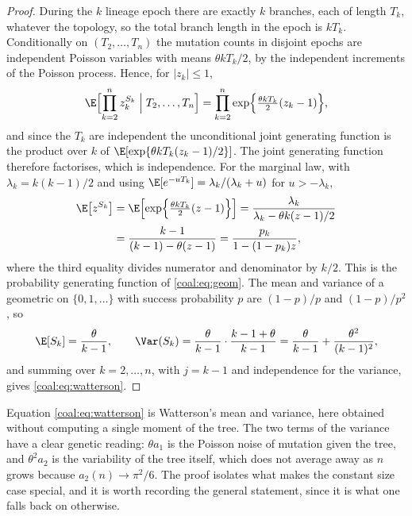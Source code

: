 \begin{proof}
During the $k$ lineage epoch there are exactly $k$ branches, each of length $T_k$, whatever the topology, so the total branch length in the epoch is $kT_k$. Conditionally on $(T_2,\dots,T_n)$ the mutation counts in disjoint epochs are independent Poisson variables with means $\theta kT_k/2$, by the independent increments of the Poisson process. Hence, for $|z_k|\le1$,
\[
\E\Bigl[\prod_{k=2}^n z_k^{S_k}\Bigm| T_2,\dots,T_n\Bigr]=\prod_{k=2}^n\exp\Bigl\{\tfrac{\theta kT_k}{2}(z_k-1)\Bigr\},
\]
and since the $T_k$ are independent the unconditional joint generating function is the product over $k$ of $\E[\exp\{\theta kT_k(z_k-1)/2\}]$. The joint generating function therefore factorises, which is independence. For the marginal law, with $\lambda_k=k(k-1)/2$ and using $\E[e^{-uT_k}]=\lambda_k/(\lambda_k+u)$ for $u>-\lambda_k$,
\begin{align*}
\E\bigl[z^{S_k}\bigr] &= \E\Bigl[\exp\Bigl\{\tfrac{\theta kT_k}{2}(z-1)\Bigr\}\Bigr]
= \frac{\lambda_k}{\lambda_k-\theta k(z-1)/2}\\
&= \frac{k-1}{(k-1)-\theta(z-1)} = \frac{p_k}{1-(1-p_k)z},
\end{align*}
where the third equality divides numerator and denominator by $k/2$. This is the probability generating function of \eqref{coal:eq:geom}. The mean and variance of a geometric on $\{0,1,\dots\}$ with success probability $p$ are $(1-p)/p$ and $(1-p)/p^2$, so
\[
\E[S_k]=\frac{\theta}{k-1},\qquad \Var(S_k)=\frac{\theta}{k-1}\cdot\frac{k-1+\theta}{k-1}=\frac{\theta}{k-1}+\frac{\theta^2}{(k-1)^2},
\]
and summing over $k=2,\dots,n$, with $j=k-1$ and independence for the variance, gives \eqref{coal:eq:watterson}.
\end{proof}

\begin{sloppypar}Equation \eqref{coal:eq:watterson} is Watterson's mean and variance, here obtained without computing a single moment of the tree. The two terms of the variance have a clear genetic reading: $\theta a_1$ is the Poisson noise of mutation given the tree, and $\theta^2a_2$ is the variability of the tree itself, which does not average away as $n$ grows because $a_2(n)\to\pi^2/6$. The proof isolates what makes the constant size case special, and it is worth recording the general statement, since it is what one falls back on otherwise.\end{sloppypar}

